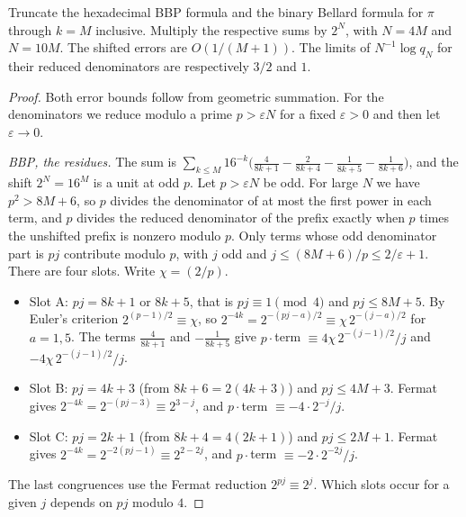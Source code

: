 \documentclass[11pt]{article}
\begin{document}
\begin{proposition}\label{prop:digitseries}
Truncate the hexadecimal BBP formula \cite[Eq.~(1.2)]{bbp} and the binary Bellard formula \cite[Eq.~(1)]{bellard} for $\pi$ through $k=M$ inclusive. Multiply the respective sums by $2^N$, with $N=4M$ and $N=10M$. The shifted errors are $O(1/(M+1))$. The limits of $N^{-1}\log q_N$ for their reduced denominators are respectively $3/2$ and $1$.
\end{proposition}
\begin{proof}
Both error bounds follow from geometric summation. For the denominators we reduce modulo a prime $p>\varepsilon N$ for a fixed $\varepsilon>0$ and then let $\varepsilon\to0$.

\emph{BBP, the residues.} The sum is $\sum_{k\le M}16^{-k}\bigl(\tfrac4{8k+1}-\tfrac2{8k+4}-\tfrac1{8k+5}-\tfrac1{8k+6}\bigr)$, and the shift $2^N=16^M$ is a unit at odd $p$. Let $p>\varepsilon N$ be odd. For large $N$ we have $p^2>8M+6$, so $p$ divides the denominator of at most the first power in each term, and $p$ divides the reduced denominator of the prefix exactly when $p$ times the unshifted prefix is nonzero modulo $p$. Only terms whose odd denominator part is $pj$ contribute modulo $p$, with $j$ odd and $j\le(8M+6)/p\le 2/\varepsilon+1$. There are four slots. Write $\chi=(2/p)$.
\begin{itemize}[leftmargin=*]
\item Slot A: $pj=8k+1$ or $8k+5$, that is $pj\equiv1\pmod4$ and $pj\le8M+5$. By Euler's criterion $2^{(p-1)/2}\equiv\chi$, so $2^{-4k}=2^{-(pj-a)/2}\equiv\chi\,2^{-(j-a)/2}$ for $a=1,5$. The terms $\tfrac4{8k+1}$ and $-\tfrac1{8k+5}$ give $p\cdot$term $\equiv4\chi\,2^{-(j-1)/2}/j$ and $-4\chi\,2^{-(j-1)/2}/j$.
\item Slot B: $pj=4k+3$ (from $8k+6=2(4k+3)$) and $pj\le4M+3$. Fermat gives $2^{-4k}=2^{-(pj-3)}\equiv2^{3-j}$, and $p\cdot$term $\equiv-4\cdot2^{-j}/j$.
\item Slot C: $pj=2k+1$ (from $8k+4=4(2k+1)$) and $pj\le2M+1$. Fermat gives $2^{-4k}=2^{-2(pj-1)}\equiv2^{2-2j}$, and $p\cdot$term $\equiv-2\cdot2^{-2j}/j$.
\end{itemize}
The last congruences use the Fermat reduction $2^{pj}\equiv2^j$. Which slots occur for a given $j$ depends on $pj$ modulo $4$.


\end{proof}
\end{document}
